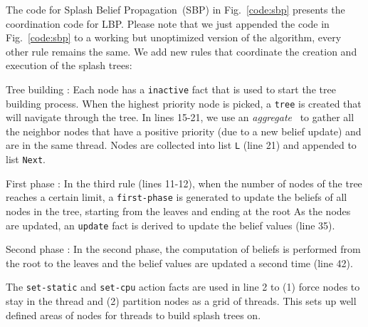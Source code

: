 The code for Splash Belief Propagation~(SBP) in Fig.~\ref{code:sbp} presents the
coordination code for LBP.  Please note that we just appended the code in
Fig.~\ref{code:sbp} to a working but unoptimized version of the algorithm, every
other rule remains the same. We add new rules that coordinate
the creation and execution of the splash trees:

\begin{tightdescription}
   \item[Tree building]: Each node has a \texttt{inactive} fact that is used to
   start the tree building process. When the highest priority node is picked, a
   \texttt{tree} is created that will navigate through the tree. In lines 15-21,
   we use an \emph{aggregate}~\cite{cruz-iclp14} to gather all the neighbor
   nodes that have a positive priority (due to a new belief update) and are in the
   same thread. Nodes are collected into list \texttt{L} (line 21) and
   appended to list \texttt{Next}.
   
   \item[First phase]: In the
   third rule (lines 11-12), when the number of nodes of the tree reaches a
   certain limit, a \texttt{first-phase} is generated to update the beliefs of
   all nodes in the tree, starting from the leaves and ending at the root As the
   nodes are updated, an \texttt{update} fact is derived to update the belief
   values (line 35).

   \item[Second phase]: In the second phase, the computation of beliefs is
   performed from the root to the leaves and the belief values are updated a
   second time (line 42).
\end{tightdescription}

The \texttt{set-static} and \texttt{set-cpu} action facts are used in
line 2 to (1) force nodes to stay in the thread and (2) 
partition nodes as a grid of threads. This sets up well defined areas
of nodes for threads to build splash trees on.

